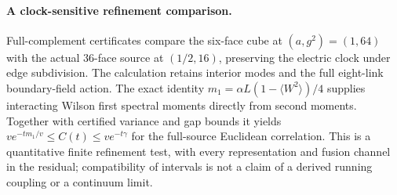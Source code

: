 \paragraph{A clock-sensitive refinement comparison.}
Full-complement certificates compare the six-face cube at $(a,g^2)=(1,64)$
with the actual $36$-face source at $(1/2,16)$, preserving the electric clock
under edge subdivision. The calculation retains interior modes and the full
eight-link boundary-field action. The exact identity
$m_1=\alpha L(1-\langle W^2\rangle)/4$ supplies interacting Wilson first spectral
moments directly from second moments. Together with certified variance and gap
bounds it yields
$v e^{-tm_1/v}\le C(t)\le v e^{-t\gamma}$ for the full-source Euclidean
correlation. This is a quantitative finite refinement test, with every
representation and fusion channel in the residual; compatibility of intervals
is not a claim of a derived running coupling or a continuum limit.

